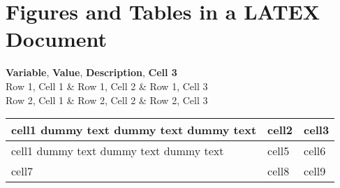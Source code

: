 
\newpage
\section{Figures and Tables in a LATEX Document}

\begin{center}
\begin{table}[htbp]
\begin{tabular}
\textbf{Variable}, \textbf{Value}, \textbf{Description}, \textbf{Cell 3} \\
Row 1, Cell 1 \& Row 1, Cell 2 \& Row 1, Cell 3 \\
Row 2, Cell 1 \& Row 2, Cell 2 \& Row 2, Cell 3 \\
\end{tabular}
\end{table}
\end{center}


\begin{center}
\begin{tabular}{ | m{5em} | m{1cm}| m{1cm} | } 
\hline
cell1 dummy text dummy text dummy text& cell2 & cell3 \\ 
\hline
cell1 dummy text dummy text dummy text & cell5 & cell6 \\ 
\hline
cell7 & cell8 & cell9 \\ 
\hline
\end{tabular}
\end{center}
